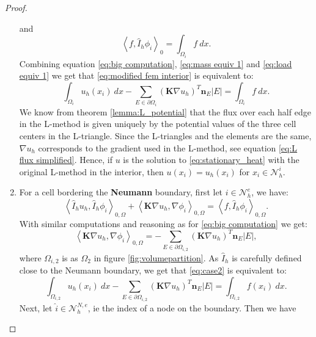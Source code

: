\documentclass[../Main/main.tex]{subfiles}
\begin{document}
\begin{proof}
\begin{enumerate}
\begin{equation}
			\end{equation}
			and
			\begin{equation}\label{eq:load equiv 1}
				\left \langle f,\hat{I}_h \phi_i \right \rangle_0 = \int_{\Omega_i}f \ dx.
			\end{equation}
			Combining equation \eqref{eq:big computation}, \eqref{eq:mass equiv 1} and \eqref{eq:load equiv 1} we get that \eqref{eq:modified fem interior} is equivalent to:
			\begin{equation}
				\int_{\Omega_i}u_h(x_i) \ dx - \sum_{E\in \partial \Omega_i} (\pmb{K}\nabla u_h)^T \pmb{n}_E |E| = \int_{\Omega_i}f \ dx.
			\end{equation}
			We know from theorem \ref{lemma:L_potential} that the flux over each half edge in the L-method is given uniquely by the potential values of the three cell centers in the L-triangle. Since the L-triangles and the elements are the same, $\nabla u_h$ corresponds to the gradient used in the L-method, see equation \eqref{eq:L flux simplified}. Hence, if $u$ is the solution to \eqref{eq:stationary_heat} with the original L-method in the interior, then $u(x_i)=u_h(x_i)$ for $x_i\in \mathcal{N}^i_h$. 
			\item For a cell bordering the \textbf{Neumann} boundary, first let $i\in \mathcal{N}_h^e$, we have:
			\begin{equation}\label{eq:case2}
				\left \langle \hat{I}_h u_h,\hat{I}_h \phi_i \right \rangle_{0,\Omega} +   \left \langle \pmb{K} \nabla u_h,\nabla \phi_i \right \rangle_{0,\Omega} = \left \langle f,\hat{I}_h \phi_i \right \rangle_{0,\Omega}.
			\end{equation}
			With similar computations and reasoning as for \eqref{eq:big computation} we get:
			\begin{equation}
					\left \langle \pmb{K} \nabla u_h,\nabla \phi_i \right \rangle_{0,\Omega}= 
					- \sum_{E\in \partial \Omega_{i,2}} (\pmb{K}\nabla u_h)^T \pmb{n}_E |E|, 
			\end{equation}
			where $\Omega_{i,2}$ is as $\Omega_2$ in figure \ref{fig:volumepartition}. As $\hat{I}_h$ is carefully defined close to the Neumann boundary, we get that \eqref{eq:case2} is equivalent to:
			\begin{equation}\label{eq:FVML neumann cell}	\int_{\Omega_{i,2}}u_h(x_i) \ dx - \sum_{E\in \partial \Omega_{i,2}} (\pmb{K}\nabla u_h)^T \pmb{n}_E |E| = \int_{\Omega_{i,2}}f(x_i) \ dx.
			\end{equation}
			Next, let $\hat{i} \in \mathcal{N}_h^{N,e}$, ie the index of a node on the boundary. Then we have 

\end{enumerate}
\end{proof}
\end{document}
